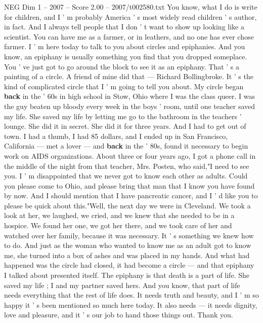 \begin{textsample}{NEG Dim 1 – 2007 – Score 2.00 – 2007/t002580.txt}  \label{ex:f1_neg_060}
You know, what I do is write for children, and I ' m probably America ' s most widely read children ' s author, in fact.
And I always tell people that I don ' t want to show up looking like a scientist.
You can have me as a farmer, or in leathers, and no one has ever chose farmer.
I ' m here today to talk to you about circles and epiphanies.
And you know, an epiphany is usually something you find that you dropped someplace.
You ' ve just got to go around the block to see it as an epiphany.
That ' s a painting of a circle.
A friend of mine did that — Richard Bollingbroke.
It ' s the kind of complicated circle that I ' m going to tell you about.
My circle began \textbf{back} in the ' 60s in high school in Stow, Ohio where I was the class queer.
I was the guy beaten up bloody every week in the boys ' room, until one teacher saved my life.
She saved my life by letting me go to the bathroom in the teachers ' lounge.
She did it in secret.
She did it for three years.
And I had to get out of town.
I had a thumb, I had 85 dollars, and I ended up in San Francisco, California — met a lover — and \textbf{back} in the ' 80s, found it necessary to begin work on AIDS organizations.
About three or four years ago, I got a phone call in the middle of the night from that teacher, Mrs.
Posten, who said,"I need to see you.
I ' m disappointed that we never got to know each other as adults.
Could you please come to Ohio, and please bring that man that I know you have found by now.
And I should mention that I have pancreatic cancer, and I ' d like you to please be quick about this."Well, the next day we were in Cleveland.
We took a look at her, we laughed, we cried, and we knew that she needed to be in a hospice.
We found her one, we got her there, and we took care of her and watched over her family, because it was necessary.
It ' s something we knew how to do.
And just as the woman who wanted to know me as an adult got to know me, she turned into a box of ashes and was placed in my hands.
And what had happened was the circle had closed, it had become a circle — and that epiphany I talked about presented itself.
The epiphany is that death is a part of life.
She saved my life ; I and my partner saved hers.
And you know, that part of life needs everything that the rest of life does.
It needs truth and beauty, and I ' m so happy it ' s been mentioned so much here today.
It also needs — it needs dignity, love and pleasure, and it ' s our job to hand those things out.
Thank you.

\end{textsample}

